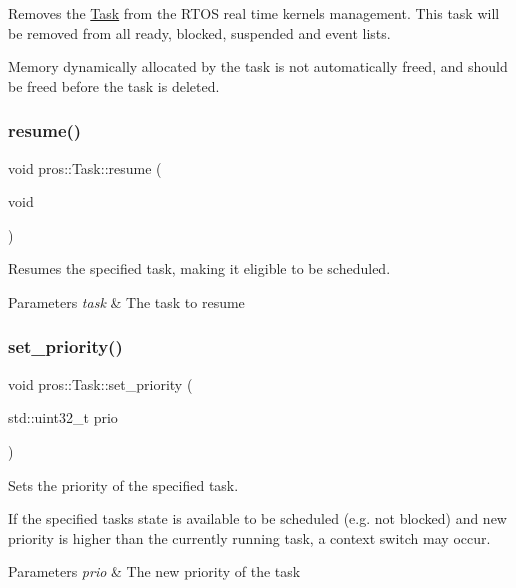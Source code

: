 Removes the \hyperlink{classpros_1_1Task}{Task} from the R\+T\+OS real time kernel\textquotesingle{}s management. This task will be removed from all ready, blocked, suspended and event lists.

Memory dynamically allocated by the task is not automatically freed, and should be freed before the task is deleted. \mbox{\label{classpros_1_1Task_ada2c08d04b39f11582cea90b59b8f317}} 
\subsubsection{\texorpdfstring{resume()}{resume()}}
{\footnotesize\ttfamily void pros\+::\+Task\+::resume (\begin{DoxyParamCaption}\item[{void}]{ }\end{DoxyParamCaption})}

Resumes the specified task, making it eligible to be scheduled.


\begin{DoxyParams}{Parameters}
{\em task} & The task to resume \\
\hline
\end{DoxyParams}
\mbox{\label{classpros_1_1Task_a205a9937d34311ba10f540bc58d0b0b9}} 
\subsubsection{\texorpdfstring{set\+\_\+priority()}{set\_priority()}}
{\footnotesize\ttfamily void pros\+::\+Task\+::set\+\_\+priority (\begin{DoxyParamCaption}\item[{std\+::uint32\+\_\+t}]{prio }\end{DoxyParamCaption})}

Sets the priority of the specified task.

If the specified task\textquotesingle{}s state is available to be scheduled (e.\+g. not blocked) and new priority is higher than the currently running task, a context switch may occur.


\begin{DoxyParams}{Parameters}
{\em prio} & The new priority of the task \\
\hline
\end{DoxyParams}
\mbox{\label{classpros_1_1Task_a89005762dcd3026c953ae5eedd7ecd97}} 
